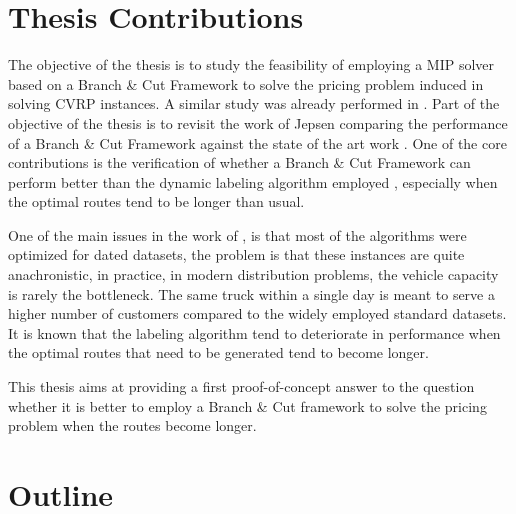 \section{Thesis Contributions}
\label{sec:intro-thesis-contributions}


The objective of the thesis is to study the feasibility of employing a MIP solver
based on a Branch \& Cut Framework to solve the pricing problem induced in solving
CVRP instances.
A similar study was already performed in \cite{Jepsen2014}.
Part of the objective of the thesis is to revisit the work of Jepsen comparing
the performance of a Branch \& Cut Framework against the state of the art work
\cite{pessoa2020generic}.
One of the core contributions is the verification of whether a Branch \& Cut Framework
can perform better than the dynamic labeling algorithm employed \cite{pessoa2020generic},
especially when the optimal routes tend to be longer than usual.

One of the main issues in the work of \cite{pessoa2020generic}, is that
most of the algorithms were optimized for dated datasets, the problem
is that these instances are quite anachronistic, in practice, in modern
distribution problems, the vehicle capacity is rarely the bottleneck.
The same truck within a single day is meant to serve a higher number of customers
compared to the widely employed standard datasets.
It is known that the labeling algorithm tend to deteriorate in performance when
the optimal routes that need to be generated tend to become longer.

This thesis aims at providing a first proof-of-concept answer to the question
whether it is better to employ a Branch \& Cut framework to solve the pricing problem
when the routes become longer.


\section{Outline}
\label{sec:intro-outline}
